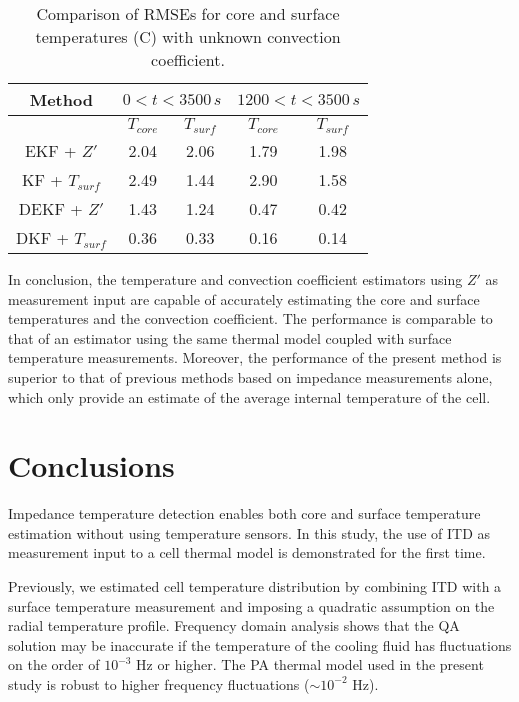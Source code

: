 \documentclass[journal, english]{IEEEtran}
\providecommand{\tabularnewline}{\\}
\begin{document}
\begin{table}[h]
\begin{centering}
\begin{tabular}{|c|c|c|c|c|}
\hline 
Method & \multicolumn{2}{c|}{$0<t<3500\,s$} & \multicolumn{2}{c|}{$1200<t<3500\,s$}\tabularnewline
\hline 
 & $T_{core}$ & $T_{surf}$ & $T_{core}$ & $T_{surf}$\tabularnewline
\hline 
\hline 
EKF + $Z'$ & 2.04 & 2.06 & 1.79 & 1.98\tabularnewline
\hline 
KF + $T_{surf}$ & 2.49 & 1.44 & 2.90 & 1.58\tabularnewline
\hline 
DEKF + $Z'$ & 1.43 & 1.24 & 0.47 & 0.42\tabularnewline
\hline 
DKF + $T_{surf}$ & 0.36 & 0.33 & 0.16 & 0.14\tabularnewline
\hline 
\end{tabular}
\par\end{centering}
\begin{centering}
\caption{Comparison of RMSEs for core and surface temperatures (\degree C) with unknown
convection coefficient.\label{tab:Comparison-of-RMSEs}}
\par\end{centering}
\end{table}
In conclusion, the temperature and convection coefficient estimators
using $Z'$ as measurement input are capable of accurately estimating
the core and surface temperatures and the convection coefficient.
The performance is comparable to that of an estimator using the same
thermal model coupled with surface temperature measurements.
Moreover, the performance of the present method is superior to that of previous methods based on impedance measurements alone, which only provide an estimate of the average internal temperature of the cell.

\section{Conclusions}
Impedance temperature detection enables both core and surface temperature estimation without using temperature sensors. In this study, the use of ITD as measurement input to a cell
thermal model is demonstrated for the first time.

Previously, we estimated cell temperature distribution by combining
ITD with a surface temperature measurement and imposing a quadratic
assumption on the radial temperature profile. Frequency domain analysis shows that the QA solution may
be inaccurate if the temperature of the cooling fluid has fluctuations on the order of $10^{-3}$ Hz or higher. The PA thermal
model used in the present study is robust to higher frequency fluctuations ($\sim10^{-2}$ Hz).
\end{document}
